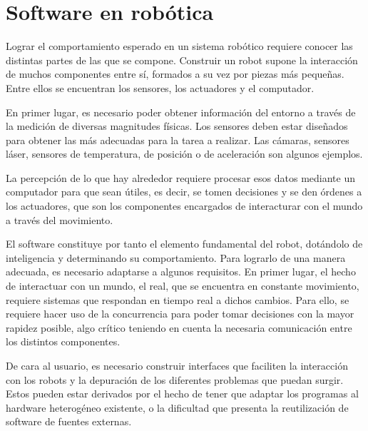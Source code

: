 \documentclass[12pt,spanish,chapterprefix, numbers=noenddot]{book}
\numberwithin{equation}{section}
\numberwithin{figure}{section}
\begin{document}
\section{Software en robótica}

Lograr el comportamiento esperado en un sistema robótico requiere conocer las distintas partes de las que se compone. Construir un robot supone la interacción de muchos componentes entre sí, formados a su vez por piezas más pequeñas. Entre ellos se encuentran los sensores, los actuadores y el computador. 

En primer lugar, es necesario poder obtener información del entorno a través de la medición de diversas magnitudes físicas. Los sensores deben estar diseñados para obtener las más adecuadas para la tarea a realizar. Las cámaras, sensores láser, sensores de temperatura, de posición o de aceleración son algunos ejemplos. 

La percepción de lo que hay alrededor requiere procesar esos datos mediante un computador para que sean útiles, es decir, se tomen decisiones y se den órdenes a los actuadores, que son los componentes encargados de interacturar con el mundo a través del movimiento. 

El software constituye por tanto el elemento fundamental del robot, dotándolo de inteligencia y determinando su comportamiento. Para lograrlo de una manera adecuada, es necesario adaptarse a algunos requisitos. En primer lugar, el hecho de interactuar con un mundo, el real, que se encuentra en constante movimiento, requiere sistemas que respondan en tiempo real a dichos cambios. Para ello, se requiere hacer uso de la concurrencia para poder tomar decisiones con la mayor rapidez posible, algo crítico teniendo en cuenta la necesaria comunicación entre los distintos componentes. 

De cara al usuario, es necesario construir interfaces que faciliten la interacción con los robots y la depuración de los diferentes problemas que puedan surgir. Estos pueden estar derivados por el hecho de tener que adaptar los programas al hardware heterogéneo existente, o la dificultad que presenta la reutilización de software de fuentes externas. 
\end{document}
